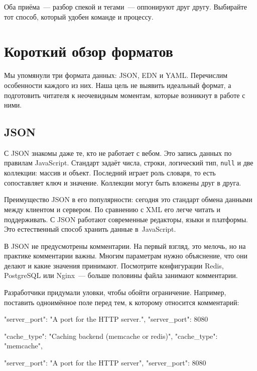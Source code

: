 Оба приёма~--- разбор спекой и тегами~--- оппонируют друг другу. Выбирайте тот
способ, который удобен команде и процессу.

\section{Короткий обзор форматов}

Мы упомянули три формата данных: JSON, EDN и YAML. Перечислим особенности
каждого из них. Наша цель не выявить идеальный формат, а подготовить читателя к
неочевидным моментам, которые возникнут в работе с ними.

\subsection{JSON}


С JSON знакомы даже те, кто не работает с вебом. Это запись данных по правилам
JavaScript. Стандарт задаёт числа, строки, логический тип, \verb|null| и две
коллекции: массив и объект. Последний играет роль словаря, то есть сопоставляет
ключ и значение. Коллекции могут быть вложены друг в друга.


Преимущество JSON в его популярности: сегодня это стандарт обмена данными между
клиентом и сервером. По сравнению с XML его легче читать и поддерживать. С JSON
работают современные редакторы, языки и платформы. Это естественный способ
хранить данные в~JavaScript.

В JSON не предусмотрены комментарии. На первый взгляд, это мелочь, но на
практике комментарии важны. Многим параметрам нужно объяснение, что они делают и
какие значения принимают. Посмотрите конфигурации Redis, PostgreSQL или
Nginx~--- больше половины файла занимают комментарии.

Разработчики придумали уловки, чтобы обойти ограничение. Например, поставить
одноимённое поле перед тем, к которому относится комментарий:

\ifnarrow

\begin{english}
  \begin{json}
{
    "server_port":
    "A port for the HTTP server.",
    "server_port": 8080
}
  \end{json}
\end{english}

\else

\begin{english}
  \begin{json}
{
  "cache_type": "Caching backend (memcache or redis)",
  "cache_type": "memcache",

  "server_port": "A port for the HTTP server",
  "server_port": 8080
}
  \end{json}
\end{english}
\fi


